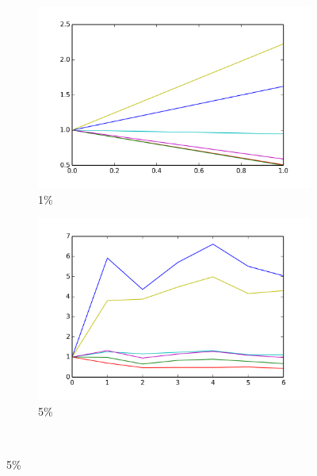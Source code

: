 \documentclass[12pt, a4paper, pdflatex, leqno]{report}
\begin{document}
\begin{figure}[htbp]
  \begin{subfigure}{.5\linewidth}\centering
    \includegraphics[width=1.1\textwidth]{graphics/convergence_LCB001.png}
    \caption{1\%\label{fig:LCB_conv.ALL:01}}
  \end{subfigure}
  \begin{subfigure}{.5\linewidth}\centering
    \includegraphics[width=1.1\textwidth]{graphics/convergence_LCB005.png}
    \caption{5\%\label{fig:LCB_conv.ALL:05}}
  \end{subfigure}\\[1ex]


\end{figure}
\end{document}
